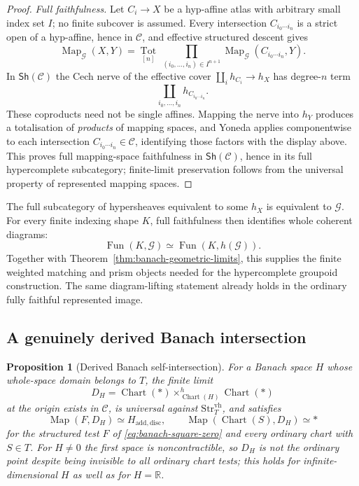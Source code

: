\documentclass[12pt]{amsart}
\newtheorem{prop}[thm]{Proposition}
\theoremstyle{definition}
\theoremstyle{remark}
\numberwithin{equation}{section}
\newcommand{\R}{\mathbb R}
\newcommand{\Sh}{\mathsf{Sh}}
\DeclareMathOperator{\Map}{Map}
\DeclareMathOperator{\Fun}{Fun}
\begin{document}
\begin{proof}
\emph{Full faithfulness.} Let $C_i\to X$ be a hyp-affine atlas with
arbitrary small index set $I$; no finite subcover is assumed. Every
intersection $C_{i_0\cdots i_n}$ is a strict open of a hyp-affine,
hence in $\mathcal C$, and effective structured descent gives
\[
 \Map_{\mathcal G}(X,Y)=
 \operatorname*{Tot}_{[n]}\ \prod_{(i_0,\dots,i_n)\in I^{n+1}}
 \Map_{\mathcal G}(C_{i_0\cdots i_n},Y).
\]
In $\Sh(\mathcal C)$ the Cech nerve of the effective cover
$\coprod_i h_{C_i}\to h_X$ has degree-$n$ term
\[
 \coprod_{i_0,\dots,i_n}h_{C_{i_0\cdots i_n}}.
\]
These coproducts need not be single affines. Mapping the nerve into $h_Y$ produces a
totalisation of \emph{products} of mapping spaces, and Yoneda
applies componentwise to each intersection
$C_{i_0\cdots i_n}\in\mathcal C$, identifying those factors with
the display above. This proves full mapping-space
faithfulness in $\Sh(\mathcal C)$, hence in its full hypercomplete
subcategory; finite-limit preservation follows from the universal
property of represented mapping spaces.
\end{proof}

The full subcategory of
hypersheaves equivalent to some $h_X$ is equivalent to
$\mathcal G$. For every finite indexing shape $K$, full
faithfulness then identifies whole coherent diagrams:
\[
 \Fun(K,\mathcal G)\simeq\Fun(K,h(\mathcal G)).
\]
Together with
Theorem~\ref{thm:banach-geometric-limits}, this supplies
the finite weighted matching and prism objects needed
for the hypercomplete groupoid construction.
The same diagram-lifting statement already holds in
the ordinary fully faithful represented image.

\subsection{A genuinely derived Banach intersection}
\label{subsec:banach-intersection}

\begin{prop}[Derived Banach self-intersection]
\label{prop:banach-derived-intersection}
For a Banach space $H$ whose whole-space domain belongs to $T$,
the finite limit
\begin{equation}
\label{eq:banach-DH}
 D_H=\operatorname{Chart}(*)
 \times^h_{\operatorname{Chart}(H)}\operatorname{Chart}(*)
\end{equation}
at the origin exists in $\mathcal C$, is universal against
$\mathrm{Str}_T^{\mathrm{vh}}$, and satisfies
\[
 \Map(F,D_H)\simeq H_{\mathrm{add,disc}},\qquad
 \Map(\operatorname{Chart}(S),D_H)\simeq *
\]
for the structured test $F$ of \eqref{eq:banach-square-zero} and
every ordinary chart with $S\in T$. For $H\neq0$ the first space
is noncontractible,
so $D_H$ is not the ordinary point despite being invisible to all
ordinary chart tests; this holds for infinite-dimensional $H$ as
well as for $H=\R$.
\end{prop}
\end{document}
